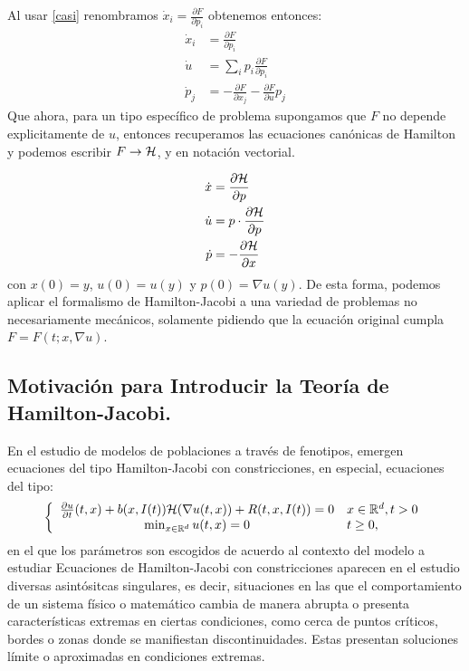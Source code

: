 Al usar \eqref{casi} renombramos $\dot x_i=\frac{\partial F}{\partial p_i}$ obtenemos entonces:
\begin{equation*}
	\begin{split}
			\dot x_i&=\frac{\partial F}{\partial p_i}\\
			\dot{u}&=\sum_i p_i\frac{\partial F}{\partial p_i}\\
			\dot p_j&=-\frac{\partial F}{\partial x_j}-\frac{\partial F}{\partial u}p_j
	\end{split}
\end{equation*}
Que ahora, para un tipo espec\'ifico de problema supongamos que $F$ no depende explicitamente de $u$, entonces recuperamos las ecuaciones can\'onicas de Hamilton y podemos escribir $F\to\mathcal{H}$, y en notaci\'on vectorial.

\begin{equation*}
	\begin{split}
			\dot x&=\frac{\partial \mathcal{H}}{\partial p}\\
			\dot{u}&=p\cdot \frac{\partial \mathcal{H}}{\partial p}\\
			\dot p&=-\frac{\partial \mathcal{H}}{\partial x}
	\end{split}
\end{equation*}
con $x(0)=y$, $u(0)=u(y)$ y $p(0)=\nabla u(y)$.
De esta forma, podemos aplicar el formalismo de Hamilton-Jacobi a una variedad de problemas no necesariamente mec\'anicos, solamente pidiendo que la ecuaci\'on original cumpla $F=F(t;x,\nabla u)$.
 \subsection{Motivación para Introducir la Teoría de Hamilton-Jacobi.}
 
 En el estudio de modelos de poblaciones a trav\'es de fenotipos, emergen ecuaciones del tipo Hamilton-Jacobi con constricciones, en especial, ecuaciones del tipo:
            \begin{equation*}
            \left\{ 
  \begin{array}{ c l }
    \frac{\partial u}{\partial t}(t,x)+b(x,I(t))\mathcal{H} (\nabla u(t,x))+R(t,x,I(t))=0 & x\in\mathbb{R}^d,t>0\\
                \min_{x\in\mathbb{R}^d} u(t,x)=0&t\geq0,
  \end{array}
\right.
            \end{equation*}
en el que los par\'ametros son escogidos de acuerdo al contexto del modelo a estudiar
            \normalsize{\citep{Barles2006} Ecuaciones de Hamilton-Jacobi con constricciones aparecen en el estudio diversas asintósitcas singulares, es decir, situaciones en las que el comportamiento de un sistema físico o matemático cambia  de manera abrupta o presenta características extremas en ciertas condiciones, como cerca de puntos críticos, bordes o zonas donde se manifiestan discontinuidades. Estas presentan soluciones límite o aproximadas en condiciones extremas.
            }\\

